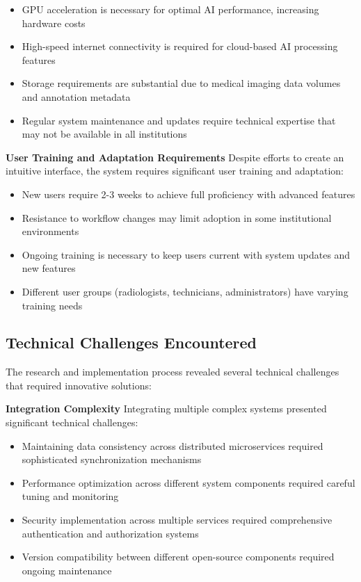 \begin{itemize}
    \item GPU acceleration is necessary for optimal AI performance, increasing hardware costs
    \item High-speed internet connectivity is required for cloud-based AI processing features
    \item Storage requirements are substantial due to medical imaging data volumes and annotation metadata
    \item Regular system maintenance and updates require technical expertise that may not be available in all institutions
\end{itemize}

\textbf{User Training and Adaptation Requirements}
Despite efforts to create an intuitive interface, the system requires significant user training and adaptation:

\begin{itemize}
    \item New users require 2-3 weeks to achieve full proficiency with advanced features
    \item Resistance to workflow changes may limit adoption in some institutional environments
    \item Ongoing training is necessary to keep users current with system updates and new features
    \item Different user groups (radiologists, technicians, administrators) have varying training needs
\end{itemize}

\subsection{Technical Challenges Encountered}

The research and implementation process revealed several technical challenges that required innovative solutions:

\textbf{Integration Complexity}
Integrating multiple complex systems presented significant technical challenges:

\begin{itemize}
    \item Maintaining data consistency across distributed microservices required sophisticated synchronization mechanisms
    \item Performance optimization across different system components required careful tuning and monitoring
    \item Security implementation across multiple services required comprehensive authentication and authorization systems
    \item Version compatibility between different open-source components required ongoing maintenance
\end{itemize}

